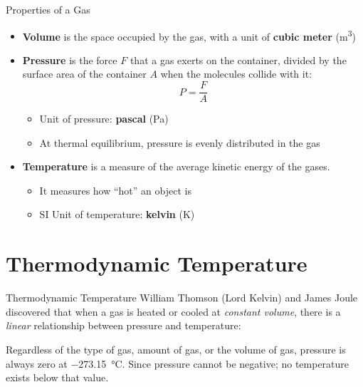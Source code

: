 \documentclass[12pt,aspectratio=169]{beamer}
\begin{document}
\begin{frame}{Properties of a Gas}
  \begin{itemize}
  \item\textbf{Volume} is the space occupied by the gas, with a unit of
    \textbf{cubic meter} (\si{\metre^3})
  \item\textbf{Pressure} is the force $F$ that a gas exerts on the container,
    divided by the surface area of the container $A$ when the molecules collide
    with it:
    \begin{displaymath}
        P=\frac{F}A
    \end{displaymath}
    \begin{itemize}
    \item\vspace{-.2in}Unit of pressure: \textbf{pascal} (\si{\pascal})
    \item At thermal equilibrium, pressure is evenly distributed in the gas
    \end{itemize}
  \item\textbf{Temperature} is a measure of the average kinetic energy of the
    gases.
    \begin{itemize}
    \item It measures how ``hot'' an object is
    \item SI Unit of temperature: \textbf{kelvin} (\si{\kelvin})
    \end{itemize}
  \end{itemize}
\end{frame}


\section{Thermodynamic Temperature}

\begin{frame}{Thermodynamic Temperature}
  William Thomson (Lord Kelvin) and James Joule discovered that when a gas is
  heated or cooled at \emph{constant volume}, there is a \emph{linear}
  relationship between pressure and temperature:
  \begin{center}
  \end{center}
  Regardless of the type of gas, amount of gas, or the volume of gas, pressure
  is always zero at \SI{-273.15}{\celsius}. Since pressure cannot be negative;
  no temperature exists below that value.
\end{frame}
\end{document}
